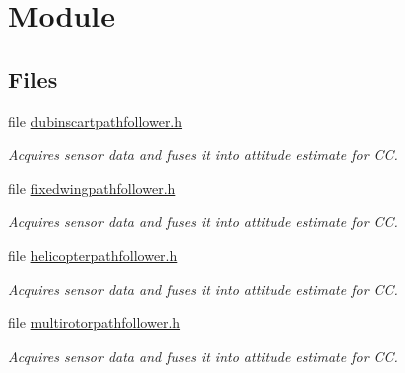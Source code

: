 \hypertarget{group___path_follower}{\section{Module}
\label{group___path_follower}
}
\subsection*{Files}
\begin{DoxyCompactItemize}
\item 
file \hyperlink{dubinscartpathfollower_8h}{dubinscartpathfollower.\-h}
\begin{DoxyCompactList}\small\item\em Acquires sensor data and fuses it into attitude estimate for C\-C. \end{DoxyCompactList}\item 
file \hyperlink{fixedwingpathfollower_8h}{fixedwingpathfollower.\-h}
\begin{DoxyCompactList}\small\item\em Acquires sensor data and fuses it into attitude estimate for C\-C. \end{DoxyCompactList}\item 
file \hyperlink{helicopterpathfollower_8h}{helicopterpathfollower.\-h}
\begin{DoxyCompactList}\small\item\em Acquires sensor data and fuses it into attitude estimate for C\-C. \end{DoxyCompactList}\item 
file \hyperlink{multirotorpathfollower_8h}{multirotorpathfollower.\-h}
\begin{DoxyCompactList}\small\item\em Acquires sensor data and fuses it into attitude estimate for C\-C. \end{DoxyCompactList}\end{DoxyCompactItemize}
